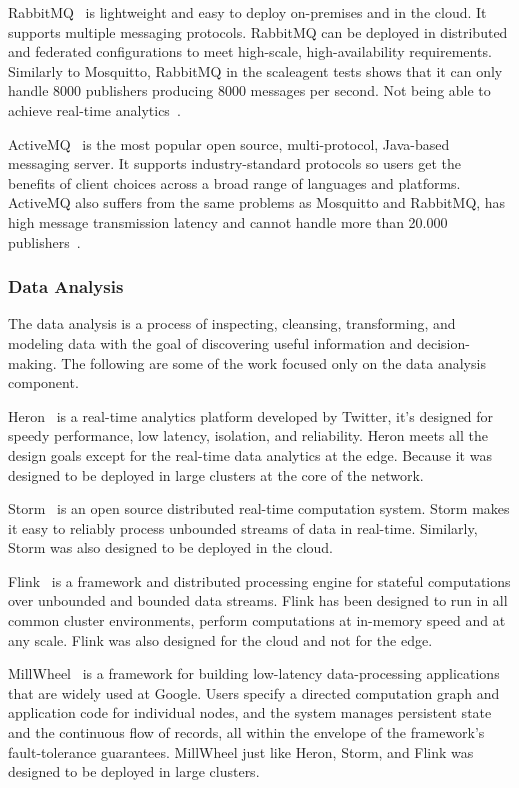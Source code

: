 RabbitMQ~\cite{RabbitMQ} is lightweight and easy to deploy on-premises and in the cloud. It supports multiple messaging protocols. RabbitMQ can be deployed in distributed and federated configurations to meet high-scale, high-availability requirements. Similarly to Mosquitto, RabbitMQ in the scaleagent tests shows that it can only handle 8000 publishers producing 8000 messages per second. Not being able to achieve real-time analytics~\cite{mqtt}.

ActiveMQ~\cite{HiveMQ} is the most popular open source, multi-protocol, Java-based messaging server. It supports industry-standard protocols so users get the benefits of client choices across a broad range of languages and platforms. ActiveMQ also suffers from the same problems as Mosquitto and RabbitMQ, has high message transmission latency and cannot handle more than 20.000 publishers~\cite{mqtt}.

\subsubsection{Data Analysis}

The data analysis is a process of inspecting, cleansing, transforming, and modeling data with the goal of discovering useful information and decision-making. The following are some of the work focused only on the data analysis component.

Heron~\cite{heron} is a real-time analytics platform developed by Twitter, it's designed for speedy performance, low latency, isolation, and reliability. Heron meets all the design goals except for the real-time data analytics at the edge. Because it was designed to be deployed in large clusters at the core of the network.

Storm~\cite{storm} is an open source distributed real-time computation system. Storm makes it easy to reliably process unbounded streams of data in real-time. Similarly, Storm was also designed to be deployed in the cloud.

Flink~\cite{flink}  is a framework and distributed processing engine for stateful computations over unbounded and bounded data streams. Flink has been designed to run in all common cluster environments, perform computations at in-memory speed and at any scale. Flink was also designed for the cloud and not for the edge.

MillWheel~\cite{millwheel} is a framework for building low-latency data-processing applications that are widely used at Google. Users specify a directed computation graph and application code for individual nodes, and the system manages persistent state and the continuous flow of records, all within the envelope of the framework's fault-tolerance guarantees. MillWheel just like Heron, Storm, and Flink was designed to be deployed in large clusters.

